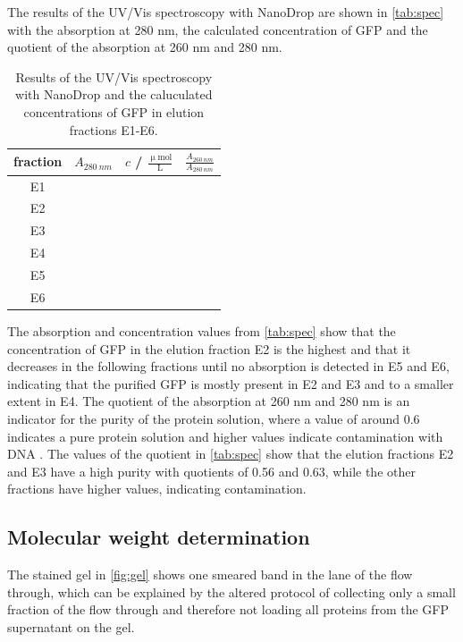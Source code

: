 \documentclass[a4paper,12pt,bibliography=totocnumbered,parskip=half,headsepline]{scrartcl}
\begin{document}
The results of the UV/Vis spectroscopy with NanoDrop are shown in \autoref{tab:spec} with the absorption at 280 nm, the calculated concentration of GFP and the quotient of the absorption at 260 nm and 280 nm.
\begin{table}[H]
    \centering
    \caption{Results of the UV/Vis spectroscopy with NanoDrop and the caluculated concentrations of GFP in elution fractions E1-E6.}
    \label{tab:spec}
    \begin{tabular}{cccc}
         fraction & $A_{\SI{280}{nm}}$ & $c$ / $\mathrm{\frac{\upmu mol}{L}}$ & $\frac{A_{\SI{260}{nm}}}{A_{\SI{280}{nm}}}$ \\
         \midrule
         E1 & & & \\
         E2 & & & \\
         E3 & & & \\
         E4 & & & \\    
         E5 & & & \\
         E6 & & & \\
    \end{tabular}
\end{table}
The absorption and concentration values from \autoref{tab:spec} show that the concentration of GFP in the elution fraction E2 is the highest and that it decreases in the following fractions until no absorption is detected in E5 and E6, indicating that the purified GFP is mostly present in E2 and E3 and to a smaller extent in E4.  The quotient of the absorption at 260 nm and 280 nm is an indicator for the purity of the protein solution, where a value of around 0.6 indicates a pure protein solution and higher values indicate contamination with DNA \parencite{Ratios}. The values of the quotient in \autoref{tab:spec} show that the elution fractions E2 and E3 have a high purity with quotients of 0.56 and 0.63, while the other fractions have higher values, indicating contamination.



\subsection{Molecular weight determination}


The stained gel in \autoref{fig:gel} shows one smeared band in the lane of the flow through, which can be explained by the altered protocol of collecting only a small fraction of the flow through and therefore not loading all proteins from the GFP supernatant on the gel.
\end{document}

